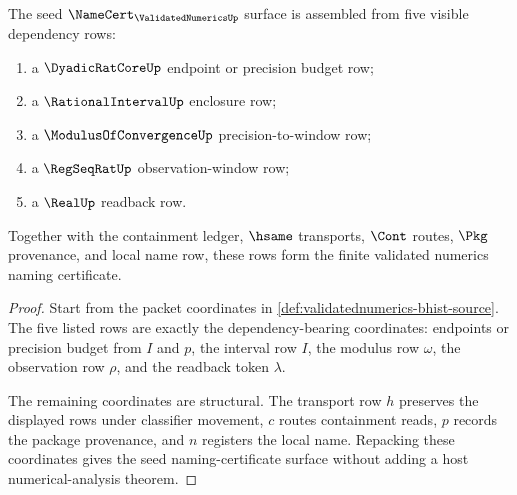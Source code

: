 \begin{theorem}
\label{thm:validatednumerics-five-row-namecert-sketch}
The seed $\NameCert_{\ValidatedNumericsUp}$ surface is assembled from five
visible dependency rows:
\begin{enumerate}
\item a $\DyadicRatCoreUp$ endpoint or precision budget row;
\item a $\RationalIntervalUp$ enclosure row;
\item a $\ModulusOfConvergenceUp$ precision-to-window row;
\item a $\RegSeqRatUp$ observation-window row;
\item a $\RealUp$ readback row.
\end{enumerate}
Together with the containment ledger, $\hsame$ transports, $\Cont$ routes,
$\Pkg$ provenance, and local name row, these rows form the finite validated
numerics naming certificate.
\end{theorem}
\begin{proof}
Start from the packet coordinates in
\autoref{def:validatednumerics-bhist-source}. The five listed rows are exactly
the dependency-bearing coordinates: endpoints or precision budget from $I$
and $p$, the interval row $I$, the modulus row $\omega$, the observation row
$\rho$, and the readback token $\lambda$.

The remaining coordinates are structural. The transport row $h$ preserves the
displayed rows under classifier movement, $c$ routes containment reads, $p$
records the package provenance, and $n$ registers the local name. Repacking
these coordinates gives the seed naming-certificate surface without adding a
host numerical-analysis theorem.
\end{proof}

